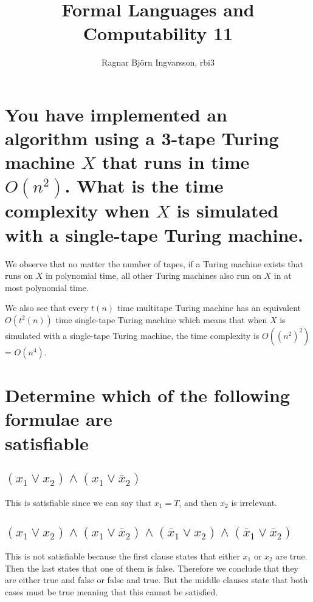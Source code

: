 \documentclass{article}
\title{Formal Languages and Computability 11}
\author{Ragnar Björn Ingvarsson, rbi3}
\begin{document}
\renewcommand\thepage{}

	\maketitle

	\newpage
	\setcounter{page}{1}
	\renewcommand\thepage{\arabic{page}}
	\renewcommand\thesubsection{\alph{subsection}.}

	\section{You have implemented an algorithm using a 3-tape Turing machine $X$ that runs in time $O(n^2)$. What is the time complexity when $X$ is 
	simulated with a single-tape Turing machine.}
	We observe that no matter the number of tapes, if a Turing machine 
	exists that runs on $X$ in polynomial time, all other Turing machines 
	also run on $X$ in at most polynomial time.

	We also see that every $t(n)$ time multitape Turing machine has 
	an equivalent $O(t^2(n))$ time single-tape Turing machine which 
	means that when $X$ is simulated with a single-tape Turing machine, 
	the time complexity is $O((n^2)^2)$ = $O(n^4)$.

	\newpage
	\section{Determine which of the following formulae are \\ satisfiable}
	\subsection{$(x_1 \lor x_2) \land (x_1 \lor \overline{x}_2)$} 
	This is satisfiable since we can say that $x_1 = T$, and then $x_2$ 
	is irrelevant.

	\subsection{$(x_1 \lor x_2) \land (x_1 \lor \overline{x}_2)
	\land (\overline{x}_1 \lor x_2) \land (\overline{x}_1 \lor 
	\overline{x}_2)$}
	This is not satisfiable because the first clause states that either 
	$x_1$ or $x_2$ are true. Then the last states that one of them is 
	false. Therefore we conclude that they are either true and false or 
	false and true. But the middle clauses state that both cases must 
	be true meaning that this cannot be satisfied.
\end{document}
